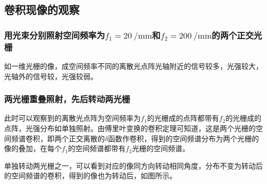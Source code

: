 \documentclass[a4paper]{article}
\begin{document}

\subsection{卷积现像的观察}


\subsubsection{用光束分别照射空间频率为$f_1=\SI{20}{\per \mm}$和$f_2=\SI{200}{\per\mm}$的两个正交光栅}
\hspace{2em} 如一维光栅的像，成空间频率不同的离散光点阵光轴附近的信号较多，光强较大，光轴外的信号较，光强较弱。 \par
\subsubsection{两光栅重叠照射，先后转动两光栅}
\hspace{2em} 此时可以观察到的离散光点阵为空间频率为$f_1$的光栅成的点阵都带有$f_2$的光栅成的点阵，光强分布如单独照射。由傅里叶变换的卷积定理可知道，这是两个光栅的空间频谱卷积，即两个正交离散的$\delta$函数作卷积，得到的空间频谱分布为两个光栅的像的叠加，在每个$f_1$的空间频谱都带有$f_2$光栅的空间频谱。\par
\hspace{2em} 单独转动两光栅之一，可以看到对应的像同方向转动相同角度，分布不变为转动后的空间频谱的卷积，得到的像也为转动后，如图所示。 \par
\end{document}
